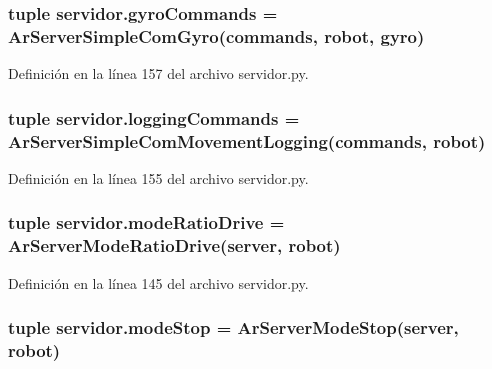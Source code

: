 \hypertarget{namespaceservidor_a9bcfd4f54186b9c69cea8188548af8c8}{
\subsubsection[{gyroCommands}]{\setlength{\rightskip}{0pt plus 5cm}tuple {\bf servidor.gyroCommands} = ArServerSimpleComGyro({\bf commands}, {\bf robot}, {\bf gyro})}}
\label{namespaceservidor_a9bcfd4f54186b9c69cea8188548af8c8}


Definición en la línea 157 del archivo servidor.py.

\hypertarget{namespaceservidor_a8f73ad33af2f2a4f3bc9209b9390cfe8}{
\subsubsection[{loggingCommands}]{\setlength{\rightskip}{0pt plus 5cm}tuple {\bf servidor.loggingCommands} = ArServerSimpleComMovementLogging({\bf commands}, {\bf robot})}}
\label{namespaceservidor_a8f73ad33af2f2a4f3bc9209b9390cfe8}


Definición en la línea 155 del archivo servidor.py.

\hypertarget{namespaceservidor_ac7cf650e754b329444bd902af26c1527}{
\subsubsection[{modeRatioDrive}]{\setlength{\rightskip}{0pt plus 5cm}tuple {\bf servidor.modeRatioDrive} = ArServerModeRatioDrive({\bf server}, {\bf robot})}}
\label{namespaceservidor_ac7cf650e754b329444bd902af26c1527}


Definición en la línea 145 del archivo servidor.py.

\hypertarget{namespaceservidor_ae7b0d696eea14b76aba1e014dbfe70f4}{
\subsubsection[{modeStop}]{\setlength{\rightskip}{0pt plus 5cm}tuple {\bf servidor.modeStop} = ArServerModeStop({\bf server}, {\bf robot})}}
\label{namespaceservidor_ae7b0d696eea14b76aba1e014dbfe70f4}


